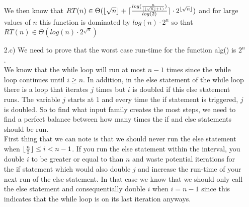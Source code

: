 \documentclass[20pt]{article}
\DeclarePairedDelimiter{\ceil}{\lceil}{\rceil}
\DeclarePairedDelimiter\floor{\lfloor}{\rfloor}
\begin{document}
\begin{enumerate}
    We then know that $RT(n) \in \Theta(\floor{\sqrt{n}} +\ceil{\frac{log(\frac{n}{(\floor{\sqrt{n}} + 1)})}{log(2)}}\cdot2^{\floor{\sqrt{n}}} \nonumber)$ and for large values of $n$ this function is dominated by $log(n)\cdot 2^n$ so that $RT(n) \in \Theta({log(n)\cdot 2^\sqrt{n}})$ \hfill\Box
    
    
    
    \item[2.c)] We need to prove that the worst case run-time for the function alg() is $2^n$.\\
    
    We know that the while loop will run at most $n-1$ times since the while loop continues until $i\geq n$. In addition, in the else statement of the while loop there is a loop that iterates $j$ times but $i$ is doubled if this else statement runs. The variable $j$ starts at $1$ and every time the if statement is triggered, $j$ is doubled. So to find what input family creates the most steps, we need to find a perfect balance between how many times the if and else statements should be run.\\
    
    First thing that we can note is that we should never run the else statement when $\floor{\frac{n}{2}} \leq i < n-1$. If you run the else statement within the interval, you double $i$ to be greater or equal to than $n$ and waste potential iterations for the if statement which would also double $j$ and increase the run-time of your next run of the else statement. In that case we know that we should only call the else statement and consequentially double $i$ when $i = n-1$ since this indicates that the while loop is on its last iteration anyways.\\
    

\end{enumerate}
\end{document}

